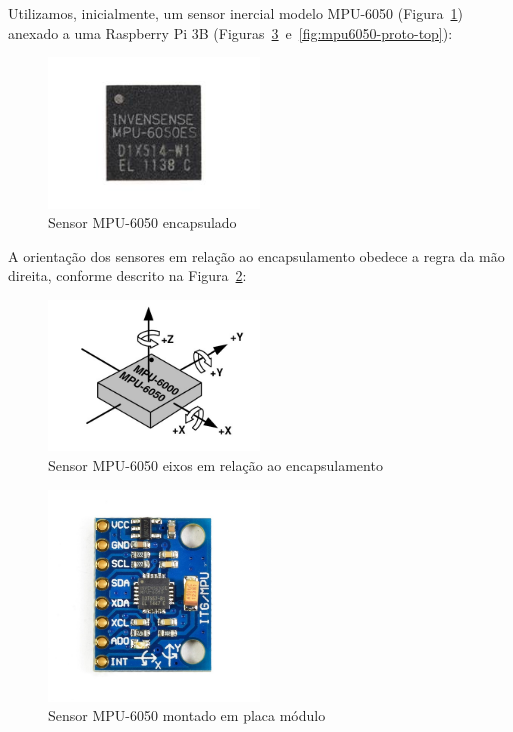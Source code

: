 Utilizamos, inicialmente, um sensor inercial modelo MPU-6050 (Figura~\ref{fig:mpu6050-sensor-top}) anexado a uma Raspberry Pi 3B (Figuras~\ref{fig:mpu6050-board-top}~e~\ref{fig:mpu6050-proto-top}):
\begin{figure}[H]
    \centering
    \caption{Sensor MPU-6050 encapsulado}\label{fig:mpu6050-sensor-top}
    \includegraphics[width=0.5\textwidth]{figuras/mpu6050-sensor-top-straight.jpg}
\end{figure}
A orientação dos sensores em relação ao encapsulamento obedece a regra da mão direita, conforme descrito na Figura~\ref{fig:mpu6050-diagram-axis}:
\begin{figure}[H]
    \centering
    \caption{Sensor MPU-6050 eixos em relação ao encapsulamento}\label{fig:mpu6050-diagram-axis}
    \includegraphics[width=0.5\textwidth]{figuras/mpu6050-diagram-axis.jpg}
\end{figure}
\begin{figure}[H]
    \centering
    \caption{Sensor MPU-6050 montado em placa módulo}\label{fig:mpu6050-board-top}
    \includegraphics[width=0.5\textwidth]{figuras/mpu6050-board-top.jpg}
\end{figure}
